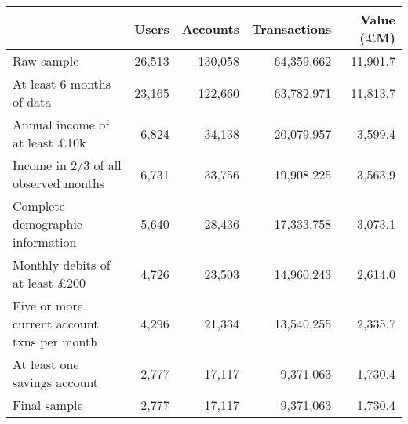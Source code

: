 \begin{tabular}{lrrrr}
\toprule
                                            &  Users & Accounts & Transactions & Value (\pounds M) \\
\midrule
                                 Raw sample & 26,513 &  130,058 &   64,359,662 &          11,901.7 \\
                  At least 6 months of data & 23,165 &  122,660 &   63,782,971 &          11,813.7 \\
       Annual income of at least \pounds10k &  6,824 &   34,138 &   20,079,957 &           3,599.4 \\
       Income in 2/3 of all observed months &  6,731 &   33,756 &   19,908,225 &           3,563.9 \\
           Complete demographic information &  5,640 &   28,436 &   17,333,758 &           3,073.1 \\
      Monthly debits of at least \pounds200 &  4,726 &   23,503 &   14,960,243 &           2,614.0 \\
Five or more current account txns per month &  4,296 &   21,334 &   13,540,255 &           2,335.7 \\
               At least one savings account &  2,777 &   17,117 &    9,371,063 &           1,730.4 \\
                               Final sample &  2,777 &   17,117 &    9,371,063 &           1,730.4 \\
\bottomrule
\end{tabular}
